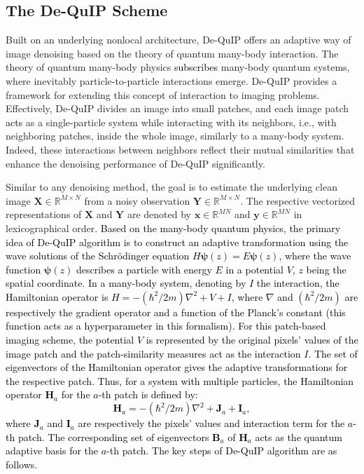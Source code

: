 \documentclass[10pt,journal,compsoc]{IEEEtran}
\newcommand{\sd}{\textcolor{black}}
\def\bsx{{\boldsymbol{x}}}
\def\bsy{{\boldsymbol{y}}}
\def\bsX{{\boldsymbol{X}}}
\def\bsY{{\boldsymbol{Y}}}
\def\bsH{{\boldsymbol{H}}}
\def\bsI{{\boldsymbol{I}}}
\def\bsJ{{\boldsymbol{J}}}
\def\bsB{{\boldsymbol{B}}}
\def\bpsi{{\boldsymbol{\psi}}}
\begin{document}
\subsection{The De-QuIP Scheme}
\label{sec:dequip}
Built on an underlying nonlocal architecture, De-QuIP \cite{dutta2021image, dutta2022novel} offers an adaptive way of image denoising based on the theory of quantum many-body interaction. The theory of quantum many-body physics \sd{subscribes}
many-body quantum systems, where inevitably particle-to-particle interactions emerge. De-QuIP provides a framework for extending this concept of interaction to imaging problems. Effectively, De-QuIP divides an image into small patches, and each image patch \sd{acts} as a single-particle system while interacting with its neighbors, i.e., with neighboring patches, inside the whole image, similarly to a many-body system. Indeed, these interactions between neighbors reflect their mutual similarities that enhance the denoising performance of De-QuIP significantly.


Similar to any denoising method, the goal is to estimate the underlying clean image $\bsX \in \mathbb{R}^{M \times N}$ from a noisy observation $\bsY \in \mathbb{R}^{M \times N}$. The respective vectorized representations of $\bsX$ and $\bsY$ are denoted by $\bsx \in \mathbb{R}^{MN}$ and $\bsy \in \mathbb{R}^{MN}$ in lexicographical order. \sd{Based on the many-body quantum physics, the primary idea of De-QuIP algorithm is to construct an adaptive transformation using the wave solutions of the Schr\"odinger equation $H \bpsi (z) = E \bpsi (z) $, where the wave function $\bpsi(z)$ describes a particle with energy $E$ in a potential $V$, $z$ being the spatial coordinate. In a many-body system, denoting by $I$ the interaction, the Hamiltonian operator is $H = -(\hbar ^2/2m)\nabla^2 + V + I$, where $\nabla$ and $(\hbar ^2/2m)$ are respectively the gradient operator and a function of the Planck's constant (this function acts as a hyperparameter in this formalism). For this patch-based imaging scheme, the potential $V$ is represented by the original pixels' values of the image patch and the patch-similarity measures act as the interaction $I$. The set of eigenvectors of the Hamiltonian operator gives the adaptive transformations for the respective patch.
Thus, for a system with multiple particles, the Hamiltonian operator $\bsH_a$ for the $a$-th patch is defined by:
\begin{equation}
\bsH_a = -(\hbar ^2/2m)\nabla^2 + \bsJ_a + \bsI_a,
\label{eq:hamiltonian}
\end{equation}
where $\bsJ_a$ and $\bsI_a$ are respectively the pixels' values and interaction term for the $a$-th patch. The corresponding set of eigenvectors $\bsB_a$ of $\bsH_a$ acts as the quantum adaptive basis for the $a$-th patch.
The key steps of De-QuIP algorithm are as follows.}
\end{document}
